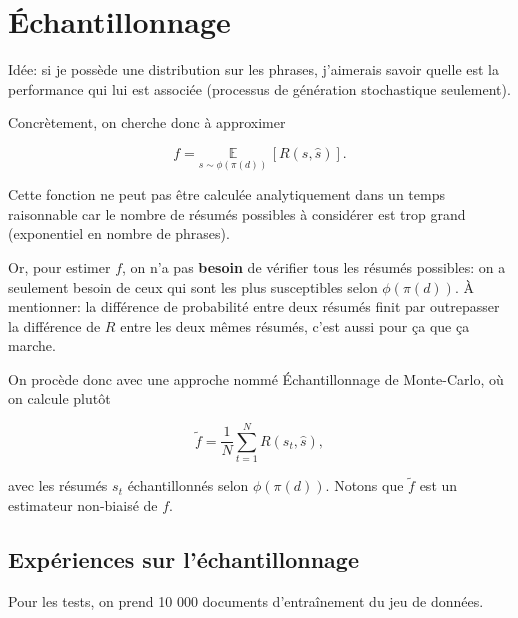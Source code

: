 \chapter{Échantillonnage}
\label{chap:mcs}                   %


Idée: si je possède une distribution sur les phrases, j'aimerais savoir
quelle est la performance qui lui est associée (processus de génération
stochastique seulement).

Concrètement, on cherche donc à approximer

\begin{equation}
    f = \underset{{s \sim \phi(\pi(d))}}{\mathbb{E}} \,\left[R(s, \hat{s})\right].
\end{equation}

Cette fonction ne peut pas être calculée analytiquement dans un temps
raisonnable car le nombre de résumés possibles à considérer est trop grand
(exponentiel en nombre de phrases).

Or, pour estimer $f$, on n'a pas \textbf{besoin} de vérifier tous les résumés
possibles: on a seulement besoin de ceux qui sont les plus susceptibles selon
$\phi(\pi(d))$.
À mentionner: la différence de probabilité entre deux résumés finit par outrepasser
la différence de $R$ entre les deux mêmes résumés, c'est aussi pour ça que ça marche.

On procède donc avec une approche nommé Échantillonnage de Monte-Carlo, où on
calcule plutôt

\begin{equation}
    \tilde{f} = \frac{1}{N} \sum_{t=1}^N R(s_t, \hat{s}),
\end{equation}

avec les résumés $s_t$ échantillonnés selon $\phi(\pi(d))$. Notons que $\tilde{f}$
est un estimateur non-biaisé de $f$.

\section{Expériences sur l'échantillonnage}

Pour les tests, on prend 10 000 documents d'entraînement du jeu de données.

